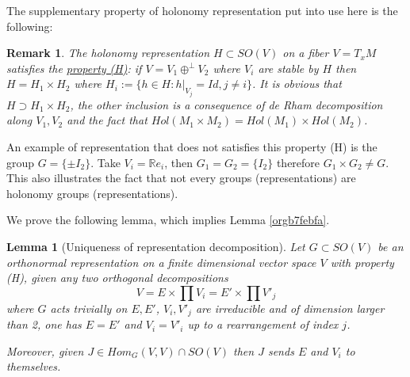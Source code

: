 \documentclass[11pt]{article}
\newtheorem{remark}{Remark}
\newtheorem{lemma}[theorem]{Lemma}
\begin{document}
The supplementary property of holonomy representation put into use here is the following:

\begin{remark}
The holonomy representation \(H\subset SO(V)\) on a fiber \(V=T_xM\) satisfies the \uline{property (H)}: if \(V
= V_1 \oplus^\perp V_2\) where \(V_i\) are stable by \(H\) then \(H = H_1\times H_2\) where \(H_i:= \{ h\in
H: h|_{V_j} = Id, j\ne i\}\). It is obvious that \(H\supset H_1\times H_2\), the other inclusion is a
consequence of de Rham decomposition along \(V_1, V_2\) and the fact that \(Hol(M_1\times M_2) =
Hol(M_1)\times Hol(M_2)\).
\end{remark}

An example of representation that does not satisfies this property (H) is the group \(G = \{\pm
I_2\}\). Take \(V_i = \mathbb{R}e_i\), then \(G_1 = G_2 = \{I_2\}\) therefore \(G_1\times G_2\ne
G\). This also illustrates the fact that not every groups (representations) are holonomy groups
(representations).

We prove the following lemma, which implies Lemma \ref{orgb7febfa}.
\begin{lemma}[Uniqueness of representation decomposition]
\label{lem:unique-representation}
\label{orgf9bc81e}
Let \(G\subset SO(V)\) be an orthonormal representation on a finite dimensional vector space \(V\) with
property (H), given any two orthogonal decompositions
\[
V = E \times \prod V_i = E' \times \prod V'_j
\]
where \(G\) acts trivially on \(E, E'\), \(V_i, V'_j\) are irreducible and of dimension larger than 2,
one has \(E = E'\) and \(V_i = V'_i\) up to a rearrangement of index \(j\).

Moreover, given \(J\in Hom_G(V,V)\cap SO(V)\) then \(J\) sends \(E\) and \(V_i\) to themselves.
\end{lemma}
\end{document}
